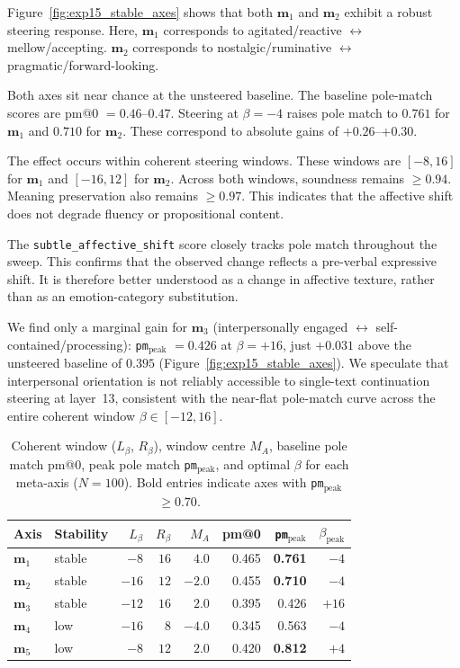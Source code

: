 Figure~\ref{fig:exp15_stable_axes} shows that both $\mathbf{m}_1$ and $\mathbf{m}_2$ exhibit a robust steering response. Here, $\mathbf{m}_1$ corresponds to agitated/reactive $\leftrightarrow$ mellow/accepting. $\mathbf{m}_2$ corresponds to nostalgic/ruminative $\leftrightarrow$ pragmatic/forward-looking.\par
Both axes sit near chance at the unsteered baseline. The baseline pole-match scores are pm@0 $= 0.46$--$0.47$. Steering at $\beta=-4$ raises pole match to $0.761$ for $\mathbf{m}_1$ and $0.710$ for $\mathbf{m}_2$. These correspond to absolute gains of $+0.26$--$+0.30$.\par
The effect occurs within coherent steering windows. These windows are $[-8,16]$ for $\mathbf{m}_1$ and $[-16,12]$ for $\mathbf{m}_2$. Across both windows, soundness remains $\geq 0.94$. Meaning preservation also remains $\geq 0.97$. This indicates that the affective shift does not degrade fluency or propositional content.\par
The \texttt{subtle\_affective\_shift} score closely tracks pole match throughout the sweep. This confirms that the observed change reflects a pre-verbal expressive shift. It is therefore better understood as a change in affective texture, rather than as an emotion-category substitution.\par

We find only a marginal gain for $\mathbf{m}_3$ (interpersonally engaged $\leftrightarrow$ self-contained/processing): \texttt{pm}$_\text{peak}$ $= 0.426$ at $\beta=+16$, just $+0.031$ above the unsteered baseline of $0.395$ (Figure~\ref{fig:exp15_stable_axes}). We speculate that interpersonal orientation is not reliably accessible to single-text continuation steering at layer~13, consistent with the near-flat pole-match curve across the entire coherent window $\beta \in [-12, 16]$.\par

\begin{table}[H]
\centering
\small
\begin{tabular}{llrrrrrr}
\toprule
\textbf{Axis} & \textbf{Stability} & $L_\beta$ & $R_\beta$ & $M_A$ & pm@0 & \texttt{pm}$_\text{peak}$ & $\beta_\mathrm{peak}$ \\
\midrule
$\mathbf{m}_1$ & stable & $-8$  & $16$ & $4.0$  & 0.465 & \textbf{0.761} & $-4$ \\
$\mathbf{m}_2$ & stable & $-16$ & $12$ & $-2.0$ & 0.455 & \textbf{0.710} & $-4$ \\
$\mathbf{m}_3$ & stable & $-12$ & $16$ & $2.0$  & 0.395 & 0.426          & $+16$ \\
$\mathbf{m}_4$ & low    & $-16$ & $8$  & $-4.0$ & 0.345 & 0.563          & $-4$ \\
$\mathbf{m}_5$ & low    & $-8$  & $12$ & $2.0$  & 0.420 & \textbf{0.812} & $+4$ \\
\bottomrule
\end{tabular}
\caption{Coherent window ($L_\beta$, $R_\beta$), window centre $M_A$, baseline pole match pm@0, peak pole match \texttt{pm}$_\text{peak}$, and optimal $\beta$ for each meta-axis ($N=100$). Bold entries indicate axes with \texttt{pm}$_\text{peak}$ $\geq 0.70$.}\label{tab:exp15_n100_summary}
\end{table}

